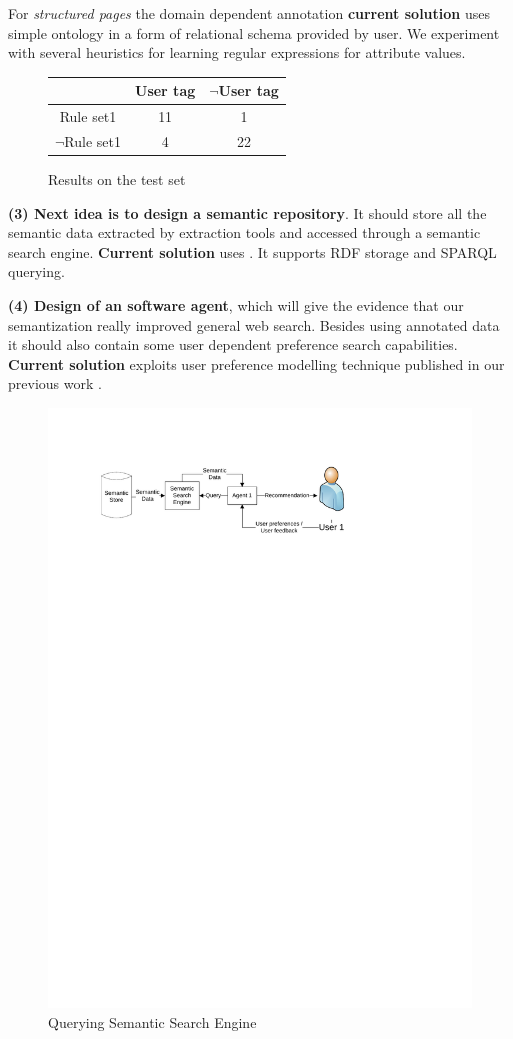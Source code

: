 \documentclass{www2009-submission}
\begin{document}
For \emph{structured pages} the domain dependent annotation \textbf{current solution} uses simple ontology in a form of relational schema provided by user. We experiment with several heuristics for learning regular expressions for attribute values.

\begin{figure}
\label{fig:results}
\centering
\begin{tabular}{|c|c|c|} \hline
 		&User tag	&$\neg$User	tag\\ \hline
Rule set1		& 11&1 \\ \hline
$\neg$Rule set1	& 4 &22\\ \hline
\end{tabular}
\caption{Results on the test set}
\end{figure}


\textbf{(3) Next idea is to design a semantic repository}. It should store all the semantic data extracted by extraction tools and accessed through a semantic search engine. 
{\bf Current solution} uses \cite{biblio:DoTySemanticWeb2007}. It supports RDF storage and SPARQL querying.


\textbf{(4) Design of an software agent}, which will give the evidence that our semantization really improved general web search. Besides using annotated data it should also contain some user dependent preference search capabilities. %
{\bf Current solution} exploits user preference modelling technique published in our previous work \cite{biblio:EcHoLearningdifferent2007}.



\begin{figure}
\centering
\includegraphics[width=\hsize, height=.3\hsize]{img/UserSearch}
\caption{Querying Semantic Search Engine}
\label{img:UserSearch}
\end{figure}
 
\end{document}
